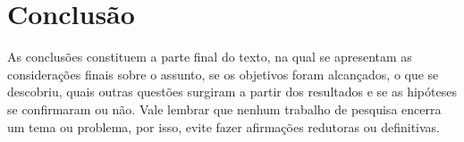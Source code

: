 \chapter{Conclusão}\label{chapter-conclusao}

As conclusões constituem a parte final do texto, na qual se apresentam as considerações finais sobre o assunto, se os objetivos foram alcançados, o que se descobriu, quais outras questões surgiram a partir dos resultados e se as hipóteses se confirmaram ou não. Vale lembrar que nenhum trabalho de pesquisa encerra um tema ou problema, por isso, evite fazer afirmações redutoras ou definitivas.